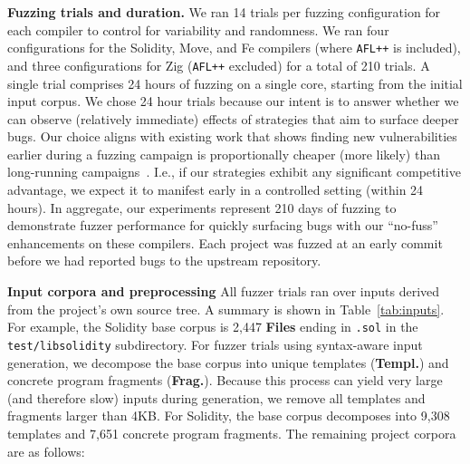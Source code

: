 \noindent \textbf{Fuzzing trials and duration.} We ran 14 trials per fuzzing
configuration for each compiler to control for variability and randomness.  We
ran four configurations for the Solidity, Move, and Fe compilers (where
\texttt{AFL++} is included), and three configurations for Zig (\texttt{AFL++}
excluded) for a total of 210 trials.  A single trial comprises 24 hours of
fuzzing on a single core, starting from the initial input corpus.  
We chose 24 hour trials because our intent is to
answer whether we can observe (relatively immediate) effects of strategies that
aim to surface deeper bugs.  Our choice aligns with existing work that shows
finding new vulnerabilities earlier during a fuzzing campaign is proportionally
cheaper (more likely) than long-running campaigns~\cite{fuzzexp}. I.e., if our
strategies exhibit any significant competitive advantage, we expect it
to manifest
early in a controlled setting (within 24 hours).  In aggregate, our
experiments represent 210 days of fuzzing to demonstrate fuzzer performance for
quickly surfacing bugs with our ``no-fuss'' enhancements on these compilers.
Each project was fuzzed at an early commit before we had reported bugs to the
upstream repository.

\begin{sloppypar}
\noindent 
\textbf{Input corpora and preprocessing} All fuzzer trials ran over inputs derived from the
project's own source tree. A summary is shown in Table~\ref{tab:inputs}. For
example, the Solidity base corpus is 2,447 \textbf{Files} ending in
\texttt{.sol} in the \texttt{test/libsolidity} subdirectory.  For fuzzer trials
using syntax-aware input generation, we decompose the base corpus into unique
templates (\textbf{Templ.}) and concrete program fragments (\textbf{Frag.}).
Because this process can yield very large (and therefore slow) inputs during
generation, we remove all templates and fragments larger than 4KB.  For
Solidity, the base corpus decomposes into 9,308 templates and 7,651 concrete
program fragments.  The remaining project corpora are as follows:
\end{sloppypar}

